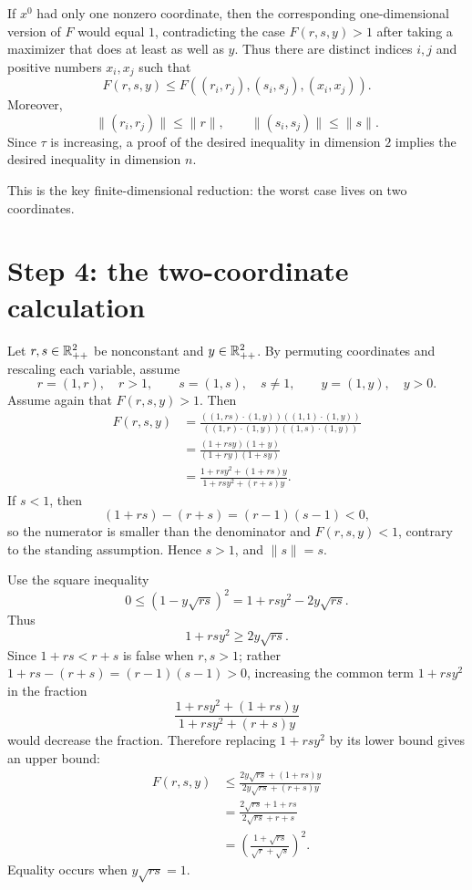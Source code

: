 If $x^0$ had only one nonzero coordinate, then the corresponding one-dimensional
version of $F$ would equal $1$, contradicting the case $F(r,s,y)>1$ after taking a
maximizer that does at least as well as $y$.  Thus there are distinct indices $i,j$ and
positive numbers $x_i,x_j$ such that
\[
  F(r,s,y)\le F((r_i,r_j),(s_i,s_j),(x_i,x_j)).
\]
Moreover,
\[
  \|(r_i,r_j)\|\le \|r\|,
  \qquad
  \|(s_i,s_j)\|\le \|s\|.
\]
Since $\tau$ is increasing, a proof of the desired inequality in dimension $2$ implies
the desired inequality in dimension $n$.

This is the key finite-dimensional reduction: the worst case lives on two coordinates.

\section*{Step 4: the two-coordinate calculation}
Let $r,s\in\mathbb{R}^2_{++}$ be nonconstant and $y\in\mathbb{R}^2_{++}$.  By permuting coordinates
and rescaling each variable, assume
\[
  r=(1,r),\quad r>1,
  \qquad
  s=(1,s),\quad s\ne1,
  \qquad
  y=(1,y),\quad y>0.
\]
Assume again that $F(r,s,y)>1$.  Then
\begin{align*}
  F(r,s,y)
  &=\frac{((1,rs)\cdot(1,y))((1,1)\cdot(1,y))}
          {((1,r)\cdot(1,y))((1,s)\cdot(1,y))}\\
  &=\frac{(1+rsy)(1+y)}{(1+ry)(1+sy)}\\
  &=\frac{1+rsy^2+(1+rs)y}{1+rsy^2+(r+s)y}.
\end{align*}
If $s<1$, then
\[
  (1+rs)-(r+s)=(r-1)(s-1)<0,
\]
so the numerator is smaller than the denominator and $F(r,s,y)<1$, contrary to the
standing assumption.  Hence $s>1$, and $\|s\|=s$.

Use the square inequality
\[
  0\le (1-y\sqrt{rs})^2=1+rsy^2-2y\sqrt{rs}.
\]
Thus
\[
  1+rsy^2\ge 2y\sqrt{rs}.
\]
Since $1+rs<r+s$ is false when $r,s>1$; rather $1+rs-(r+s)=(r-1)(s-1)>0$, increasing
the common term $1+rsy^2$ in the fraction
\[
  \frac{1+rsy^2+(1+rs)y}{1+rsy^2+(r+s)y}
\]
would decrease the fraction.  Therefore replacing $1+rsy^2$ by its lower bound gives
an upper bound:
\begin{align*}
  F(r,s,y)
  &\le
  \frac{2y\sqrt{rs}+(1+rs)y}{2y\sqrt{rs}+(r+s)y}\\
  &=\frac{2\sqrt{rs}+1+rs}{2\sqrt{rs}+r+s}\\
  &=\left(\frac{1+\sqrt{rs}}{\sqrt r+\sqrt s}\right)^2.
\end{align*}
Equality occurs when $y\sqrt{rs}=1$.

